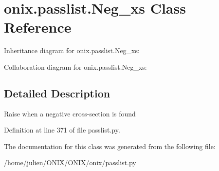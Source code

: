 \hypertarget{classonix_1_1passlist_1_1Neg__xs}{}\section{onix.\+passlist.\+Neg\+\_\+xs Class Reference}
\label{classonix_1_1passlist_1_1Neg__xs}


Inheritance diagram for onix.\+passlist.\+Neg\+\_\+xs\+:


Collaboration diagram for onix.\+passlist.\+Neg\+\_\+xs\+:


\subsection{Detailed Description}
\begin{DoxyVerb}Raise when a negative cross-section is found\end{DoxyVerb}
 

Definition at line 371 of file passlist.\+py.



The documentation for this class was generated from the following file\+:\begin{DoxyCompactItemize}
\item 
/home/julien/\+O\+N\+I\+X/\+O\+N\+I\+X/onix/passlist.\+py\end{DoxyCompactItemize}
